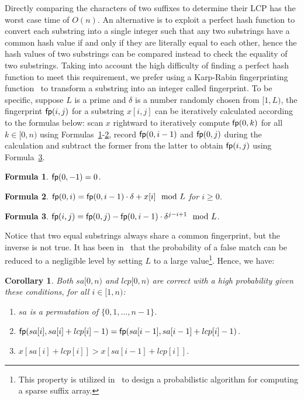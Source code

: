 \documentclass[10pt,journal,compsoc]{IEEEtran}
\newtheorem{Formula}{Formula}
\newtheorem{Corollary}{Corollary}
\begin{document}
Directly comparing the characters of two suffixes to determine their LCP has the worst case time of $O(n)$. An alternative is to exploit a perfect hash function to convert each substring into a single integer such that any two substrings have a common hash value if and only if they are literally equal to each other, hence the hash values of two substrings can be compared instead to check the equality of two substrings. Taking into account the high difficulty of finding a perfect hash function to meet this requirement, we prefer using a Karp-Rabin fingerprinting function~\cite{Karp1987} to transform a substring into an integer called fingerprint. To be specific, suppose $L$ is a prime and $\delta$ is a number randomly chosen from $[1, L)$, the fingerprint ${\sf fp}(i, j)$ for a substring $x[i, j]$ can be iteratively calculated according to the formulas below: scan $x$ rightward to iteratively compute ${\sf fp}(0, k)$ for all $k \in [0, n)$ using Formulas~\ref{formula:1}-\ref{formula:2}, record ${\sf fp}(0, i - 1)$ and ${\sf fp}(0, j)$ during the calculation and subtract the former from the latter to obtain ${\sf fp}(i, j)$ using Formula~\ref{formula:3}.


\begin{Formula} \label{formula:1}
	${\sf fp}(0, -1) = 0$.
	
\end{Formula}

\begin{Formula} \label{formula:2}	
	${\sf fp}(0, i) = {\sf fp}(0, i - 1) \cdot {\delta} + x[i]\mod L$ for $i \ge 0$.
	
\end{Formula}

\begin{Formula} \label{formula:3}
	${\sf fp}(i, j) = {\sf fp}(0, j) - {\sf fp}(0 ,i - 1) \cdot {\delta}^{j - i + 1}\mod L$.
	
\end{Formula}


Notice that two equal substrings always share a common fingerprint, but the inverse is not true. It has been %
{\color{red}{proved}} in~\cite{Karp1987} that the probability of a false match can be reduced to a negligible level by setting $L$ to a large value\footnote{This property is utilized in~\cite{Bille2013} to design a probabilistic algorithm for computing a sparse suffix array.}. Hence, we have:


\begin{Corollary} \label{corollary:1}
	Both $sa[0, n)$ and $lcp[0, n)$ are correct with a high probability given these conditions, for all $i \in [1, n)$:
	
	\begin{enumerate}[(1)]
		\item
		$sa$ is a permutation of $\{0, 1, \dots, n - 1\}$.
		
		\item
		${\sf fp}(sa[i], sa[i] + lcp[i] - 1) = {\sf fp}(sa[i - 1], sa[i - 1] + lcp[i] - 1)$.
		
		\item
		$x[sa[i] + lcp[i]] > x[sa[i - 1] + lcp[i]]$.
	\end{enumerate}
\end{Corollary}
\end{document}
